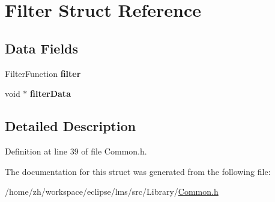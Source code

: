 \hypertarget{structFilter}{\section{Filter Struct Reference}
\label{structFilter}
}
\subsection*{Data Fields}
\begin{DoxyCompactItemize}
\item 
\hypertarget{structFilter_af7a4d06f1c38dd9234cb5ff044c9e739}{Filter\-Function {\bfseries filter}}\label{structFilter_af7a4d06f1c38dd9234cb5ff044c9e739}

\item 
\hypertarget{structFilter_a76700c71c75772c1bc1ff1f57dea861e}{void $\ast$ {\bfseries filter\-Data}}\label{structFilter_a76700c71c75772c1bc1ff1f57dea861e}

\end{DoxyCompactItemize}


\subsection{Detailed Description}


Definition at line 39 of file Common.\-h.



The documentation for this struct was generated from the following file\-:\begin{DoxyCompactItemize}
\item 
/home/zh/workspace/eclipse/lms/src/\-Library/\hyperlink{Common_8h}{Common.\-h}\end{DoxyCompactItemize}
